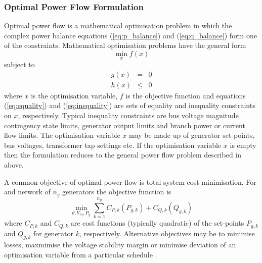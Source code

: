 \subsubsection{Optimal Power Flow Formulation}
Optimal power flow is a mathematical optimisation problem in which the complex
power balance equations (\ref{eq:p_balance}) and (\ref{eq:q_balance}) form one
of the constraints. Mathematical optimisation problems have the general form
\begin{equation}
\min_x f(x)
\end{equation}
subject to
\begin{eqnarray}
\label{eq:equality}
g(x)& =& 0\\
\label{eq:inequality}
h(x)& \leq& 0
\end{eqnarray}
where $x$ is the optimisation variable, $f$ is the objective function and
equations (\ref{eq:equality}) and (\ref{eq:inequality}) are sets of equality
and inequality constraints on $x$, respectively.  Typical inequality
constraints are bus voltage magnitude contingency state limits, generator
output limits and branch power or current flow limits.  The optimisation
variable $x$ may be made up of generator set-points, bus voltages, transformer
tap settings etc.  If the optimisation variable $x$ is empty then the
formulation reduces to the general power flow problem described in above.

A common objective of optimal power flow is total system cost minimisation.
For and network of $n_g$ generators the objective function is
\begin{equation}
\label{eq:objfunc}
\min_{\theta, V_m, P_g} \sum_{k=1}^{n_g} C_{P,k}(P_{g,k}) + C_{Q,k}(Q_{g,k})
\end{equation}
where $C_{P,k}$ and $C_{Q,k}$ are cost functions (typically quadratic) of the
set-points $P_{g,k}$ and $Q_{g,k}$ for generator $k$, respectively. Alternative
objectives may be to minimise losses, maxmimise the voltage stability margin or
minimise deviation of an optimisation variable from a particular schedule
\cite[\S18]{kallrath:2009}.

